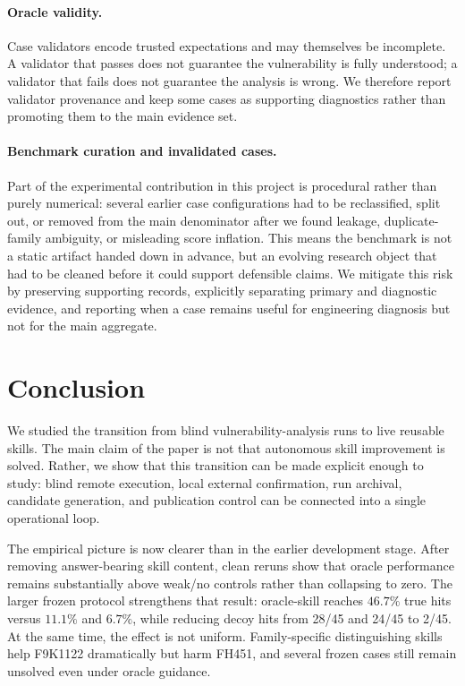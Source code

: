 ﻿\documentclass[preprint,12pt]{elsarticle}
\begin{document}
\paragraph{Oracle validity.}
Case validators encode trusted expectations and may themselves be
incomplete.  A validator that passes does not guarantee the vulnerability
is fully understood; a validator that fails does not guarantee the analysis
is wrong.  We therefore report validator provenance and keep some cases as
supporting diagnostics rather than promoting them to the main evidence set.

\paragraph{Benchmark curation and invalidated cases.}
Part of the experimental contribution in this project is procedural rather
than purely numerical: several earlier case configurations had to be
reclassified, split out, or removed from the main denominator after we
found leakage, duplicate-family ambiguity, or misleading score inflation.
This means the benchmark is not a static artifact handed down in advance,
but an evolving research object that had to be cleaned before it could
support defensible claims.  We mitigate this risk by preserving supporting
records, explicitly separating primary and diagnostic evidence, and
reporting when a case remains useful for engineering diagnosis but not for
the main aggregate.

\section{Conclusion}
\label{sec:conclusion}

We studied the transition from blind vulnerability-analysis runs to live
reusable skills.  The main claim of the paper is not that autonomous skill
improvement is solved.  Rather, we show that this transition can be made
explicit enough to study: blind remote execution, local external
confirmation, run archival, candidate generation, and publication control
can be connected into a single operational loop.

The empirical picture is now clearer than in the earlier development stage.
After removing answer-bearing skill content, clean reruns show that oracle
performance remains substantially above weak/no controls rather than
collapsing to zero.  The larger frozen protocol strengthens that result:
oracle-skill reaches $46.7\%$ true hits versus $11.1\%$ and $6.7\%$, while
reducing decoy hits from 28/45 and 24/45 to 2/45.  At the same time, the
effect is not uniform.  Family-specific distinguishing skills help
F9K1122 dramatically but harm FH451, and several frozen cases still remain
unsolved even under oracle guidance.
\end{document}
